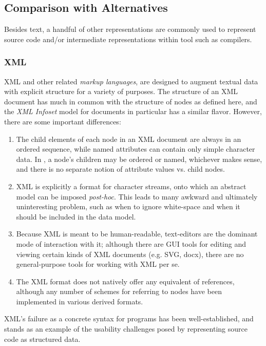 \subsection{Comparison with Alternatives}
Besides text, a handful of other representations are commonly used to represent source code and/or intermediate representations within tool such as compilers.

\subsubsection{XML}
XML and other related \emph{markup languages}, are designed to augment textual data with explicit structure for a variety of purposes. The structure of an XML document has much in common with the structure of nodes as defined here, and the \emph{XML Infoset}\cite{infoset} model for documents in particular has a similar flavor. However, there are some important differences:
\begin{enumerate}
\item The child elements of each node in an XML document are always in an ordered sequence, while named attributes can contain only simple character data. In \Meta, a node's children may be ordered or named, whichever makes sense, and there is no separate notion of attribute values vs. child nodes.
\item XML is explicitly a format for character streams, onto which an abstract model can be imposed \textit{post-hoc}. This leads to many awkward and ultimately uninteresting problem, such as when to ignore white-space and when it should be included in the data model.
\item Because XML is meant to be human-readable, text-editors are the dominant mode of interaction with it; although there are GUI tools for editing and viewing certain kinds of XML documents (e.g. SVG\cite{svg}, docx\cite{openoffice}), there are no general-purpose tools for working with XML per se.
\item The XML format does not natively offer any equivalent of references, although any number of schemes for referring to nodes have been implemented in various derived formats.
\end{enumerate}

XML's failure as a concrete syntax for programs has been well-established, and stands as an example of the usability challenges posed by representing source code as structured data\cite{?}.

